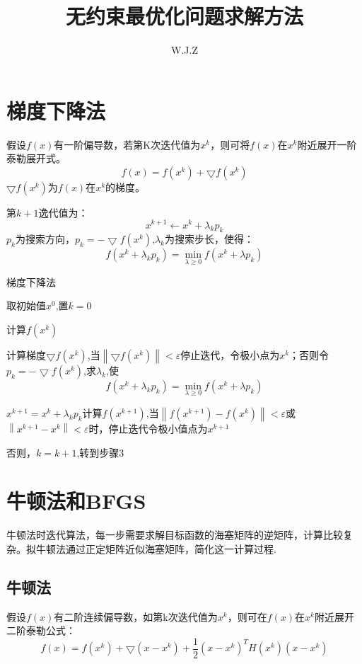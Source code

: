 \documentclass{report}
\title{无约束最优化问题求解方法}
\author{W.J.Z}
\date{}
\begin{document}
	\maketitle
	\section{梯度下降法}
	假设$f(x)$有一阶偏导数，若第K次迭代值为$x^{k}$，则可将$f(x)$在$x^{k}$附近展开一阶泰勒展开式。
	$$f\left ( x \right )=f\left ( x^{k} \right )+\bigtriangledown f\left ( x^{k} \right )$$
	$\bigtriangledown f\left ( x^{k} \right )$为$f(x)$在$x^{k}$的梯度。
	
	第$k+1$逸代值为：$$x^{k+1}\leftarrow x^{k}+\lambda _{k}p_{k}$$
	$p_{k}$为搜索方向，$p_{k}=-\bigtriangledown f\left ( x^{k} \right )$,$\lambda _{k}$为搜索步长，使得：
	$$f\left ( x^{k}+\lambda _{k}p_{k} \right )=\mathop{min}_{\lambda \geq 0}f\left ( x^{k}+\lambda p_{k} \right )$$
	\begin{algorithm}[h]
		\caption{梯度下降法}
		\LinesNumbered
		取初始值$x^{0}$,置$k=0$
		
		计算$f(x^{k})$
		
		计算梯度$\bigtriangledown f\left ( x^{k} \right )$,当$\left \| \bigtriangledown f\left ( x^{k} \right ) \right \|< \varepsilon $停止迭代，令极小点为$x^{k}$；否则令$p_{k}=-\bigtriangledown f\left ( x^{k} \right )$,求$\lambda _{k}$,使$$f\left ( x^{k}+\lambda _{k}p_{k} \right )=\mathop{min}_{\lambda \geq 0}f\left ( x^{k}+\lambda p_{k} \right )$$
		
		$x^{k+1}= x^{k}+\lambda _{k}p_{k}$计算$f(x^{k+1})$,当$\left \| f\left ( x^{k+1} \right ) -f\left ( x^{k} \right )\right \|< \varepsilon $或$\left \| x^{k+1}-x^{k} \right \|< \varepsilon $时，停止迭代令极小值点为$x^{k+1}$
		
		否则，$k=k+1$,转到步骤3
	\end{algorithm}
	\section{牛顿法和BFGS}
	牛顿法时迭代算法，每一步需要求解目标函数的海塞矩阵的逆矩阵，计算比较复杂。拟牛顿法通过正定矩阵近似海塞矩阵，简化这一计算过程.
	\subsection{牛顿法}
	假设$f(x)$有二阶连续偏导数，如第k次迭代值为$x^{k}$，则可在$f(x)$在$x^{k}$附近展开二阶泰勒公式：
	$$f\left ( x \right )=f\left ( x^{k} \right )+\bigtriangledown \left ( x-x^{k} \right )+\frac{1}{2}\left ( x-x^{k} \right )^{T}H\left ( x^{k} \right )\left ( x-x^{k} \right )$$
	
\end{document}
